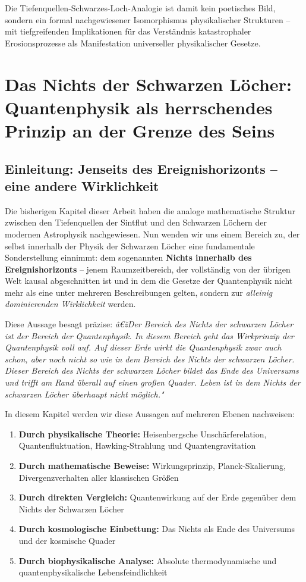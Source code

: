 ﻿\documentclass[12pt,a4paper]{report}
\begin{document}
Die Tiefenquellen-Schwarzes-Loch-Analogie ist damit kein poetisches Bild, sondern ein formal nachgewiesener Isomorphismus physikalischer Strukturen -- mit tiefgreifenden Implikationen für das Verständnis katastrophaler Erosionsprozesse als Manifestation universeller physikalischer Gesetze.

\chapter{Das Nichts der Schwarzen Löcher: Quantenphysik als herrschendes Prinzip an der Grenze des Seins}
\label{sec:nichts_quanten}

\section{Einleitung: Jenseits des Ereignishorizonts -- eine andere Wirklichkeit}

Die bisherigen Kapitel dieser Arbeit haben die analoge mathematische Struktur zwischen den Tiefenquellen der Sintflut und den Schwarzen Löchern der modernen Astrophysik nachgewiesen. Nun wenden wir uns einem Bereich zu, der selbst innerhalb der Physik der Schwarzen Löcher eine fundamentale Sonderstellung einnimmt: dem sogenannten \textbf{Nichts innerhalb des Ereignishorizonts} -- jenem Raumzeitbereich, der vollständig von der übrigen Welt kausal abgeschnitten ist und in dem die Gesetze der Quantenphysik nicht mehr als eine unter mehreren Beschreibungen gelten, sondern zur \emph{alleinig dominierenden Wirklichkeit} werden.

Diese Aussage besagt präzise: \textit{â€žDer Bereich des Nichts der schwarzen Löcher ist der Bereich der Quantenphysik. In diesem Bereich geht das Wirkprinzip der Quantenphysik voll auf. Auf dieser Erde wirkt die Quantenphysik zwar auch schon, aber noch nicht so wie in dem Bereich des Nichts der schwarzen Löcher. Dieser Bereich des Nichts der schwarzen Löcher bildet das Ende des Universums und trifft am Rand überall auf einen großen Quader. Leben ist in dem Nichts der schwarzen Löcher überhaupt nicht möglich."}

In diesem Kapitel werden wir diese Aussagen auf mehreren Ebenen nachweisen:
\begin{enumerate}
    \item \textbf{Durch physikalische Theorie:} Heisenbergsche Unschärferelation, Quantenfluktuation, Hawking-Strahlung und Quantengravitation
    \item \textbf{Durch mathematische Beweise:} Wirkungsprinzip, Planck-Skalierung, Divergenzverhalten aller klassischen Größen
    \item \textbf{Durch direkten Vergleich:} Quantenwirkung auf der Erde gegenüber dem Nichts der Schwarzen Löcher
    \item \textbf{Durch kosmologische Einbettung:} Das Nichts als Ende des Universums und der kosmische Quader
    \item \textbf{Durch biophysikalische Analyse:} Absolute thermodynamische und quantenphysikalische Lebensfeindlichkeit
\end{enumerate}
\end{document}
